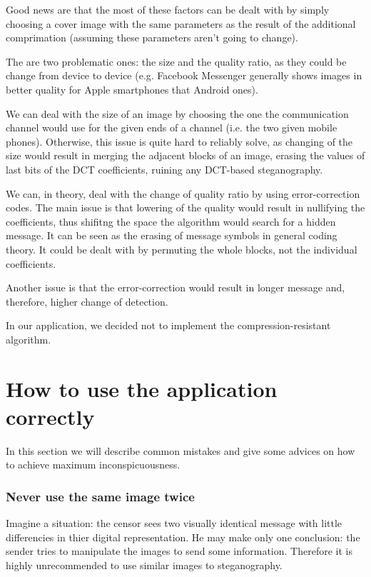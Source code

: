 Good news are that the most of these factors can be dealt with by simply choosing a cover
image with the same parameters as the result of the additional comprimation (assuming 
these parameters aren't going to change).   

The are two problematic ones: the size and the quality ratio, as they could be change
from device to device (e.g. Facebook Messenger generally shows images in better 
quality for Apple smartphones that Android ones). 

We can deal with the size of an image by choosing the one the communication channel 
would use for the given ends of a channel (i.e. the two given mobile phones). Otherwise,
this issue is quite hard to reliably solve, as changing of the size would result in
merging the adjacent blocks of an image, erasing the values of last bits of the DCT coefficients,
ruining any DCT-based steganography.

We can, in theory, deal with the change of quality ratio by using error-correction codes.
The main issue is that lowering of the quality would result in nullifying the coefficients,
thus shifitng the space the algorithm would search for a hidden message. It can be seen
as the erasing of message symbols in general coding theory. It could be dealt with
by permuting the whole blocks, not the individual coefficients.

Another issue is that the error-correction would result in longer message and, therefore,
higher change of detection.

In our application, we decided not to implement the compression-resistant algorithm.

\section{How to use the application correctly}
In this section we will describe common mistakes and give some advices on
how to achieve maximum inconspicuousness.

\subsubsection{Never use the same image twice}

Imagine a situation: the censor sees two visually identical message with little 
differencies in thier digital representation. He may make only one conclusion: 
the sender tries to manipulate the images to send some information. Therefore
it is highly unrecommended to use similar images to steganography.

